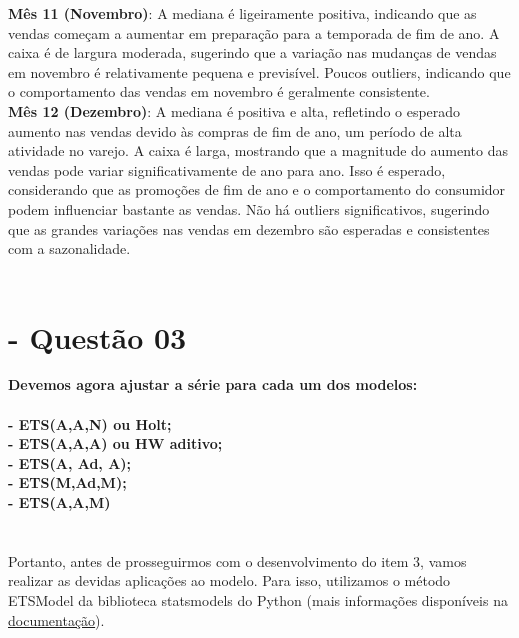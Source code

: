 \documentclass[a4paper, 12pt]{article}
\begin{document}
\textbf{Mês 11 (Novembro)}: A mediana é ligeiramente positiva, indicando que as vendas começam a aumentar em preparação para a temporada de fim de ano. A caixa é de largura moderada, sugerindo que a variação nas mudanças de vendas em novembro é relativamente pequena e previsível. Poucos outliers, indicando que o comportamento das vendas em novembro é geralmente consistente.\\


\textbf{Mês 12 (Dezembro)}:  A mediana é positiva e alta, refletindo o esperado aumento nas vendas devido às compras de fim de ano, um período de alta atividade no varejo. A caixa é larga, mostrando que a magnitude do aumento das vendas pode variar significativamente de ano para ano. Isso é esperado, considerando que as promoções de fim de ano e o comportamento do consumidor podem influenciar bastante as vendas. Não há outliers significativos, sugerindo que as grandes variações nas vendas em dezembro são esperadas e consistentes com a sazonalidade.\\\\



\section{- Questão 03}



\textbf{
Devemos agora ajustar a série para cada um dos modelos: \\\\
- ETS(A,A,N) ou Holt;\\
- ETS(A,A,A) ou HW aditivo;\\
- ETS(A, Ad, A);\\
- ETS(M,Ad,M);\\
- ETS(A,A,M) \\\\
} \\

Portanto, antes de prosseguirmos com o desenvolvimento do item 3, vamos realizar as devidas aplicações ao modelo. Para isso, utilizamos o método ETSModel da biblioteca statsmodels do Python (mais informações disponíveis na \href{https://www.statsmodels.org/dev/examples/notebooks/generated/ets.html}{documentação}).\\
\end{document}
